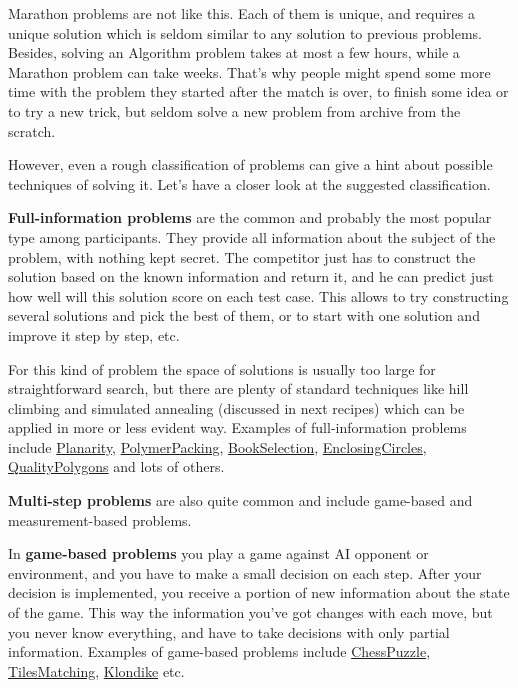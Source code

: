 Marathon problems are not like this. Each of them is unique, and
requires a unique solution which is seldom similar to any solution to
previous problems. Besides, solving an Algorithm problem takes at most a
few hours, while a Marathon problem can take weeks. That's why people
might spend some more time with the problem they started after the match
is over, to finish some idea or to try a new trick, but seldom solve a
new problem from archive from the scratch.

However, even a rough classification of problems can give a hint about
possible techniques of solving it. Let's have a closer look at the
suggested classification.

\textbf{Full-information problems} are the common and probably the most
popular type among participants. They provide all information about the
subject of the problem, with nothing kept secret. The competitor just
has to construct the solution based on the known information and return
it, and he can predict just how well will this solution score on each
test case. This allows to try constructing several solutions and pick
the best of them, or to start with one solution and improve it step by
step, etc.

For this kind of problem the space of solutions is usually too large for
straightforward search, but there are plenty of standard techniques like
hill climbing and simulated annealing (discussed in next recipes) which
can be applied in more or less evident way. Examples of full-information
problems include
\href{http://www.topcoder.com/longcontest/?module=ViewProblemStatement\&rd=14300\&pm=10942}{Planarity},
\href{http://www.topcoder.com/longcontest/?module=ViewProblemStatement\&rd=14264\&pm=10918}{PolymerPacking},
\href{http://www.topcoder.com/longcontest/?module=ViewProblemStatement\&rd=14227\&pm=10885}{BookSelection},
\href{http://www.topcoder.com/longcontest/?module=ViewProblemStatement\&rd=13964\&pm=10655}{EnclosingCircles},
\href{http://community.topcoder.com/longcontest/?module=ViewProblemStatement\&rd=14556\&pm=11441}{QualityPolygons}
and lots of others.

\textbf{Multi-step problems} are also quite common and include
game-based and measurement-based problems.

In \textbf{game-based problems} you play a game against AI opponent or
environment, and you have to make a small decision on each step. After
your decision is implemented, you receive a portion of new information
about the state of the game. This way the information you've got changes
with each move, but you never know everything, and have to take
decisions with only partial information. Examples of game-based problems
include
\href{http://www.topcoder.com/longcontest/?module=ViewProblemStatement\&rd=14195\&pm=10728}{ChessPuzzle},
\href{http://www.topcoder.com/longcontest/?module=ViewProblemStatement\&rd=13795\&pm=10410}{TilesMatching},
\href{http://www.topcoder.com/longcontest/?module=ViewProblemStatement\&rd=13565\&pm=10014}{Klondike}
etc.

